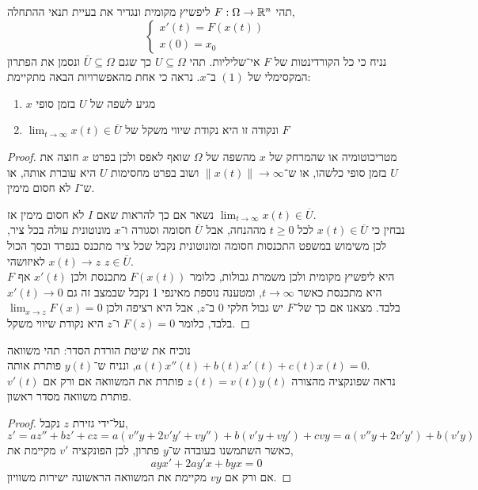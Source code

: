 \question{}
תהי $F : \Omega \to \mathbb{R}^n$ ליפשיץ מקומית ונגדיר את בעיית תנאי ההתחלה,
\[
	\begin{cases}
		x'(t) = F(x(t)) \\
		x(0) = x_0
	\end{cases}
	\tag{1}
\]
נניח כי כל הקורדינטות של $F$ אי־שליליות.
תהי $U \subseteq \Omega$ כך שגם $\bar{U} \subseteq \Omega$ ונסמן את הפתרון המקסימלי של $(1)$ ב־$x$.
נראה כי אחת מהאפשרויות הבאה מתקיימת:
\begin{enumerate}
	\item $x$ מגיע לשפה של $U$ בזמן סופי
	\item $\lim_{t \to \infty} x(t) \in \bar{U}$ ונקודה זו היא נקודת שיווי משקל של $F$
\end{enumerate}
\begin{proof}
	מטריכוטומיה או שהמרחק של $x$ מהשפה של $\Omega$ שואף לאפס ולכן בפרט $x$ חוצה את $U$ בזמן סופי כלשהו, או ש־$\lVert x(t) \rVert \to \infty$ ושוב בפרט מחסימות $U$ היא עוברת אותה, או ש־$I$ לא חסום מימין.

	נשאר אם כך להראות שאם $I$ לא חסום מימין אז $\lim_{t \to \infty} x(t) \in \overline{U}$. \\
	נבחין כי $x(t) \in \overline{U}$ לכל $t \ge 0$ מההנחה, אבל $\overline{U}$ חסומה וסגורה ו־$x$ מונוטונית עולה בכל ציר,
	לכן משימוש במשפט התכנסות חסומה ומונוטונית נקבל שכל ציר מתכנס בנפרד ובסך הכול $x(t) \to z$ לאיזושהי $z \in \overline{U}$. \\
	$F$ היא ליפשיץ מקומית ולכן משמרת גבולות, כלומר $F(x(t))$ מתכנסת ולכן $x'(t)$ אף היא מתכנסת כאשר $t \to \infty$, ומטענה נוספת מאינפי 1 נקבל שבמצב זה גם $x'(t) \to 0$ בלבד.
	מצאנו אם כך של־$F$ יש גבול חלקי $0$ ב־$z$, אבל היא רציפה ולכן $\lim_{x \to z} F(x) = 0$ בלבד, כלומר $F(z) = 0$ ו־$z$ היא נקודת שיווי משקל.
\end{proof}

\question{}
\subquestion{}
נוכיח את שיטת הורדת הסדר:
תהי משוואה $a(t) x''(t) + b(t) x'(t) + c(t) x(t) = 0$, ונניח ש־$y(t)$ פותרת אותה. \\
נראה שפונקציה מהצורה $z(t) = v(t) y(t)$ פותרת את המשוואה אם ורק אם $v'(t)$ פותרת משוואה מסדר ראשון.
\begin{proof}
	על־ידי גזירת $z$ נקבל,
	\[
		z'
		= a z'' + b z' + c z
		= a (v'' y + 2 v' y' + v y'') + b (v' y + v y') + c v y
		= a (v'' y + 2 v' y') + b (v' y)
	\]
	כאשר השתמשנו בעובדה ש־$y$ פתרון, לכן הפונקציה $v'$ מקיימת את,
	\[
		a y x' + 2 a y' x + b y x = 0
	\]
	אם ורק אם $v y$ מקיימת את המשוואה הראשונה ישירות משוויון.
\end{proof}

